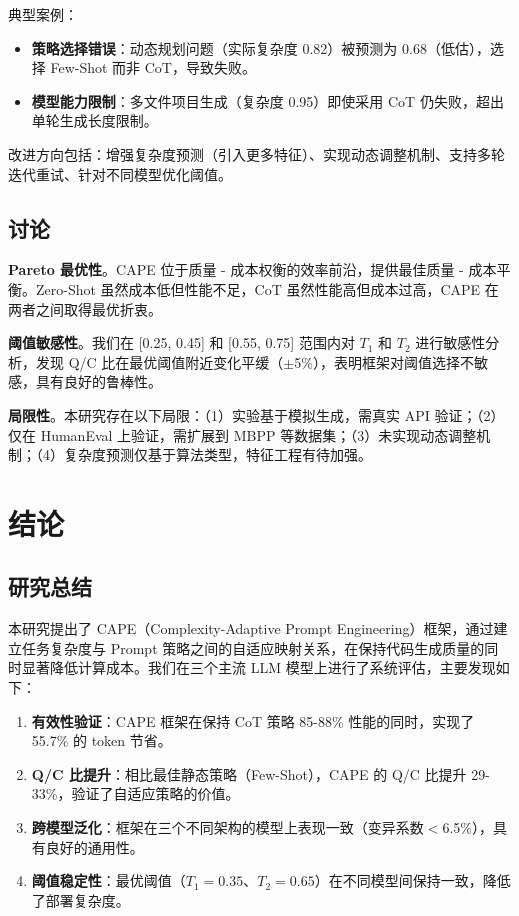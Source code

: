 \documentclass[11pt,a4paper]{article}
\begin{document}
典型案例：
\begin{itemize}[leftmargin=*]
    \item \textbf{策略选择错误}：动态规划问题（实际复杂度 0.82）被预测为 0.68（低估），选择 Few-Shot 而非 CoT，导致失败。
    \item \textbf{模型能力限制}：多文件项目生成（复杂度 0.95）即使采用 CoT 仍失败，超出单轮生成长度限制。
\end{itemize}

改进方向包括：增强复杂度预测（引入更多特征）、实现动态调整机制、支持多轮迭代重试、针对不同模型优化阈值。

\subsection{讨论}

\textbf{Pareto 最优性}。CAPE 位于质量 - 成本权衡的效率前沿，提供最佳质量 - 成本平衡。Zero-Shot 虽然成本低但性能不足，CoT 虽然性能高但成本过高，CAPE 在两者之间取得最优折衷。

\textbf{阈值敏感性}。我们在 [0.25, 0.45] 和 [0.55, 0.75] 范围内对 $T_1$ 和 $T_2$ 进行敏感性分析，发现 Q/C 比在最优阈值附近变化平缓（$\pm$5\%），表明框架对阈值选择不敏感，具有良好的鲁棒性。

\textbf{局限性}。本研究存在以下局限：（1）实验基于模拟生成，需真实 API 验证；（2）仅在 HumanEval 上验证，需扩展到 MBPP 等数据集；（3）未实现动态调整机制；（4）复杂度预测仅基于算法类型，特征工程有待加强。

\section{结论}

\subsection{研究总结}

本研究提出了 CAPE（Complexity-Adaptive Prompt Engineering）框架，通过建立任务复杂度与 Prompt 策略之间的自适应映射关系，在保持代码生成质量的同时显著降低计算成本。我们在三个主流 LLM 模型上进行了系统评估，主要发现如下：

\begin{enumerate}[leftmargin=*]
    \item \textbf{有效性验证}：CAPE 框架在保持 CoT 策略 85-88\% 性能的同时，实现了 55.7\% 的 token 节省。
    
    \item \textbf{Q/C 比提升}：相比最佳静态策略（Few-Shot），CAPE 的 Q/C 比提升 29-33\%，验证了自适应策略的价值。
    
    \item \textbf{跨模型泛化}：框架在三个不同架构的模型上表现一致（变异系数$<$6.5\%），具有良好的通用性。
    
    \item \textbf{阈值稳定性}：最优阈值（$T_1=0.35$、$T_2=0.65$）在不同模型间保持一致，降低了部署复杂度。
\end{enumerate}
\end{document}
